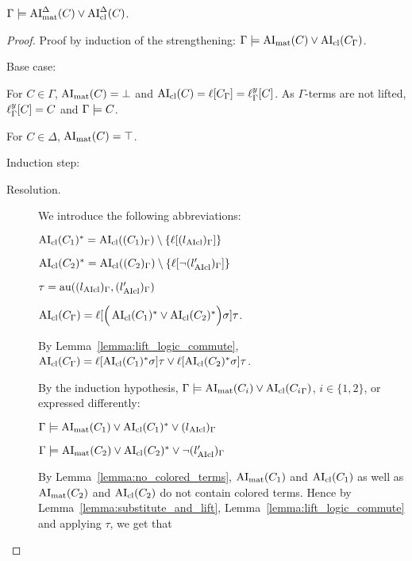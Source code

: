 \documentclass[,%
	paper=a4,%
	DIV12, %
	twoside=false,%
	liststotoc,
	bibtotoc,
	draft=false,%
	numbers=noendperiod
]{scrartcl}
\begin{document}
\begin{lemma}
	\label{ref:gamma_entails_delta_terms_lifted}
	$\Gamma \models \operatorname{AI}_\mathrm{mat}^\Delta(C) \lor \operatorname{AI}_\mathrm{cl}^\Delta(C)$.
\end{lemma}
\begin{proof}
	Proof by induction of the strengthening:
	$\Gamma \models \operatorname{AI}_\mathrm{mat}(C) \lor \operatorname{AI}_\mathrm{cl}(C_\Gamma)$.

	Base case:

	For $C \in \Gamma$, $\operatorname{AI}_\mathrm{mat}(C) = \bot$ and $\operatorname{AI}_\mathrm{cl}(C) = \ell[C_\Gamma] = \ell_{\Gamma}^{y}[C]$. As $\Gamma$-terms are not lifted, $\ell_{\Gamma}^{y}[C] = C$ and $\Gamma \models C$.

	For $C \in \Delta$, $\operatorname{AI}_\mathrm{mat}(C) = \top$.

	Induction step:
	\begin{description}
		\item[Resolution.]\hfill
			\begin{prooftree}
			\end{prooftree}
			We introduce the following abbreviations:

			$ \operatorname{AI}_\mathrm{cl}(C_1)^* = \operatorname{AI}_\mathrm{cl}((C_1)_\Gamma) \setminus \{\ell[(l{_{\operatorname{AIcl}}})_\Gamma]\}$

			$ \operatorname{AI}_\mathrm{cl}(C_2)^* = \operatorname{AI}_\mathrm{cl}((C_2)_\Gamma)\setminus \{\ell[\lnot (l{_{\operatorname{AIcl}}'})_\Gamma]\}$

			$\tau  = \operatorname{au}((l{_{\operatorname{AIcl}}})_\Gamma, (l{_{\operatorname{AIcl}}'})_\Gamma)$

			$\operatorname{AI}_\mathrm{cl}(C_\Gamma) =
			\ell[\Big( \operatorname{AI}_\mathrm{cl}(C_1)^* \lor \operatorname{AI}_\mathrm{cl}(C_2)^* \Big)\sigma] \tau$.

			By Lemma~\ref{lemma:lift_logic_commute},
			$\operatorname{AI}_\mathrm{cl}(C_\Gamma) =
			\ell[\operatorname{AI}_\mathrm{cl}(C_1)^*\sigma]\tau \lor \ell[\operatorname{AI}_\mathrm{cl}(C_2)^*\sigma] \tau$.

			By the induction hypothesis,
			$\Gamma \models \operatorname{AI}_\mathrm{mat}(C_i) \lor \operatorname{AI}_\mathrm{cl}({C_i}_\Gamma)$, $i\in\{1,2\}$, or expressed differently:


			$\Gamma \models \operatorname{AI}_\mathrm{mat}(C_1) \lor \operatorname{AI}_\mathrm{cl}(C_1)^* \lor {(l{\ensuremath{_{\operatorname{AIcl}}}})_\Gamma}$

			$\Gamma \models \operatorname{AI}_\mathrm{mat}(C_2) \lor \operatorname{AI}_\mathrm{cl}(C_2)^* \lor {\lnot (l{\ensuremath{_{\operatorname{AIcl}}}'})_\Gamma}$

			By Lemma~\ref{lemma:no_colored_terms}, $\operatorname{AI}_\mathrm{mat}(C_1)$ and $\operatorname{AI}_\mathrm{cl}(C_1)$ as well as $\operatorname{AI}_\mathrm{mat}(C_2)$ and $\operatorname{AI}_\mathrm{cl}(C_2)$ do not contain colored terms.
			Hence by Lemma~\ref{lemma:substitute_and_lift}, Lemma~\ref{lemma:lift_logic_commute} and applying $\tau$, we get that 


\end{description}
\end{proof}
\end{document}
